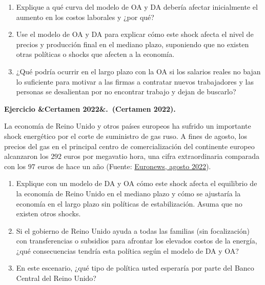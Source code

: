\documentclass[11pt]{article}
\newcounter{ejercicio}
\newcommand{\ejercicio}[1][]{%
  \stepcounter{ejercicio}%
  \bigskip\noindent\textbf{Ejercicio \arabic{ejercicio}\ifx&#1&\relax.\else\ (#1).\fi}\ %
}
\newenvironment{partes}
  {\begin{enumerate}[label=(\alph*), leftmargin=1.5cm]}
  {\end{enumerate}}
\begin{document}
\begin{partes}
    \item Explique a qué curva del modelo de OA y DA debería afectar inicialmente el aumento en los costos laborales y ¿por qué?
    \item Use el modelo de OA y DA para explicar cómo este shock afecta el nivel de precios y producción final en el mediano plazo, suponiendo que no existen otras políticas o shocks que afecten a la economía.
    \item ¿Qué podría ocurrir en el largo plazo con la OA si los salarios reales no bajan lo suficiente para motivar a las firmas a contratar nuevos trabajadores y las personas se desalientan por no encontrar trabajo y dejan de buscarlo?
\end{partes}


\ejercicio[Certamen 2022]
La economía de Reino Unido y otros países europeos ha sufrido un importante shock energético por el corte de suministro de gas ruso. A fines de agosto, los precios del gas en el principal centro de comercialización del continente europeo alcanzaron los $292$ euros por megavatio hora, una cifra extraordinaria comparada con los $97$ euros de hace un año (Fuente: \href{https://es.euronews.com/my-europe/2022/08/25/hasta-donde-pueden-llegar-los-precios-del-gas-en-europa-tras-batir-un-nuevo-record}{Euronews, agosto 2022}).

\begin{partes}
    \item Explique con un modelo de DA y OA cómo este shock afecta el equilibrio de la economía de Reino Unido en el mediano plazo y cómo se ajustaría la economía en el largo plazo sin políticas de estabilización. Asuma que no existen otros shocks.
    \item Si el gobierno de Reino Unido ayuda a todas las familias (sin focalización) con transferencias o subsidios para afrontar los elevados costos de la energía, ¿qué consecuencias tendría esta política según el modelo de DA y OA? 
    \item En este escenario, ¿qué tipo de política usted esperaría por parte del Banco Central del Reino Unido?
\end{partes}

\end{document}

